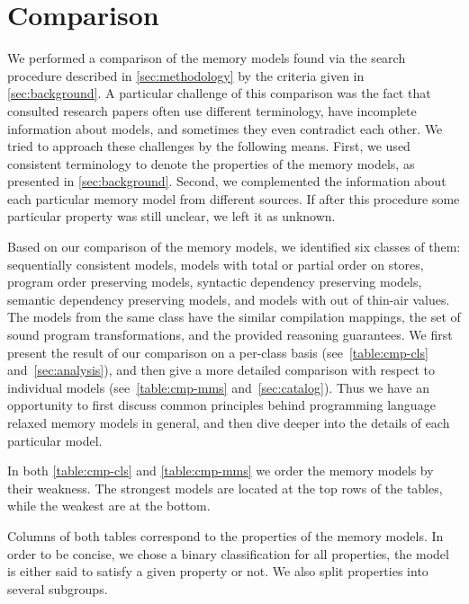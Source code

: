 \section{Comparison}
\label{sec:comparison}

We performed a comparison of the memory models 
found via the search procedure described in \cref{sec:methodology} 
by the criteria given in \cref{sec:background}. 
A particular challenge of this comparison was the fact that 
consulted research papers often use different terminology, 
have incomplete information about models, and 
sometimes they even contradict each other. 
We tried to approach these challenges by the following means.
First, we used consistent terminology 
to denote the properties of the memory models, 
as presented in \cref{sec:background}.
Second, we complemented the information about 
each particular memory model from different sources.
If after this procedure some particular property 
was still unclear, we left it as unknown. 

Based on our comparison of the memory models, 
we identified six classes of them:
sequentially consistent models,
models with total or partial order on stores,
program order preserving models, 
syntactic dependency preserving models, 
semantic dependency preserving models, 
and models with out of thin-air values. 
The models from the same class have the similar compilation mappings, 
the set of sound program transformations, and the provided reasoning guarantees.
We first present the result of our comparison on a per-class basis 
(see~\cref{table:cmp-cls} and~\cref{sec:analysis}), and 
then give a more detailed comparison with respect to individual models
(see~\cref{table:cmp-mms} and~\cref{sec:catalog}).
Thus we have an opportunity to first discuss common principles
behind programming language relaxed memory models in general, 
and then dive deeper into the details of each particular model. 

In both \cref{table:cmp-cls} and \cref{table:cmp-mms} we order
the memory models by their weakness.  
The strongest models are located at the top rows of the tables, 
while the weakest are at the bottom.  

Columns of both tables correspond 
to the properties of the memory models.
In order to be concise, we chose a binary classification for all properties,
\ie the model is either said to satisfy a given property or not.  
We also split properties into several subgroups.

